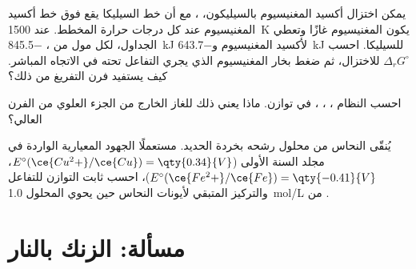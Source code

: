 \begin{exercise}[$\star\star\star$]\label{exo:b2:ellingham:10}
يمكن اختزال أكسيد المغنيسيوم بالسيليكون، ، مع أن
خط السيليكا يقع فوق خط أكسيد المغنيسيوم عند كل درجات حرارة
المخطط. عند \qty{1500}{K} يكون المغنيسيوم غازًا وتعطي الجداول، لكل مول من
، \qty{-845.5}{kJ} لأكسيد المغنيسيوم و\qty{-643.7}{kJ} للسيليكا.
احسب $\Delta_r G^\circ$ للاختزال، ثم ضغط بخار المغنيسيوم
الذي يجري التفاعل تحته في الاتجاه المباشر. كيف يستفيد فرن التفريغ من ذلك؟
\end{exercise}

\begin{exercise}[$\star\star\star$]\label{exo:b2:ellingham:11}
احسب  النظام ، ، ،
 في توازن. ماذا يعني ذلك للغاز الخارج من الجزء العلوي
من الفرن العالي؟
\end{exercise}

\begin{exercise}[$\star\star\star$]\label{exo:b2:ellingham:12}
يُنقّى النحاس من محلول رشحه  بخردة الحديد.
مستعملًا الجهود المعيارية الواردة في مجلد السنة الأولى ($E^\circ(\ce{Cu^2+}/\ce{Cu})
= \qty{0.34}{V}$، $E^\circ(\ce{Fe^2+}/\ce{Fe}) = \qty{-0.41}{V}$)، احسب
ثابت التوازن للتفاعل  والتركيز
المتبقي لأيونات النحاس حين يحوي المحلول \qty{1.0}{mol/L} من
.
\end{exercise}

\section{مسألة: الزنك بالنار}


